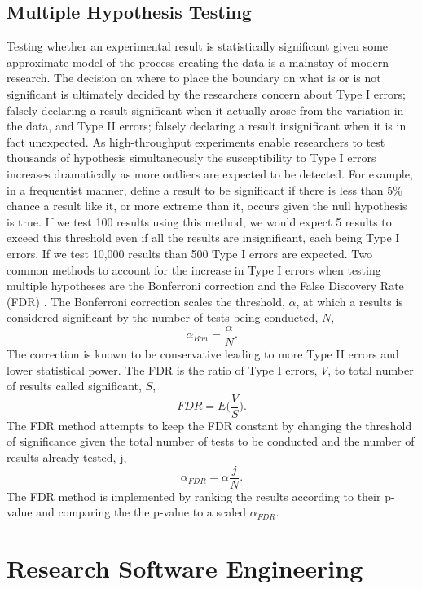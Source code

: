 \documentclass[../main.tex]{subfiles}
\begin{document}
\subsection{Multiple Hypothesis Testing}

Testing whether an experimental result is statistically significant given some approximate model of the process creating the data is a mainstay of modern research.
The decision on where to place the boundary on what is or is not significant is ultimately decided by the researchers concern about Type I errors; falsely declaring a result significant when it actually arose from the variation in the data, and Type II errors; falsely declaring a result insignificant when it is in fact unexpected.
As high-throughput experiments enable researchers to test thousands of hypothesis simultaneously the susceptibility to Type I errors increases dramatically as more outliers are expected to be detected.
For example, in a frequentist manner, define a result to be significant if there is less than 5\% chance a result like it, or more extreme than it, occurs given the null hypothesis is true.
If we test 100 results using this method, we would expect 5 results to exceed this threshold even if all the results are insignificant, each being Type I errors.
If we test 10,000 results than 500 Type I errors are expected.
Two common methods to account for the increase in Type I errors when testing multiple hypotheses are the Bonferroni correction and the False Discovery Rate (FDR) \parencite{Bonferroni1936, Hochberg1995}.
The Bonferroni correction scales the threshold, $\alpha$, at which a results is considered significant by the number of tests being conducted, $N$,
$$\alpha_{Bon} = \frac{\alpha}{N}.$$
The correction is known to be conservative leading to more Type II errors and lower statistical power.
The FDR is the ratio of Type I errors, $V$, to total number of results called significant, $S$,
$$FDR = E\Big(\frac{V}{S}\Big).$$ 
The FDR method attempts to keep the FDR constant by changing the threshold of significance given the total number of tests to be conducted and the number of results already tested, j,
$$\alpha_{FDR} = \alpha \frac{j}{N}.$$
The FDR method is implemented by ranking the results according to their p-value and comparing the the p-value to a scaled $\alpha_{FDR}$.

\newpage

\section{Research Software Engineering}
\end{document}
